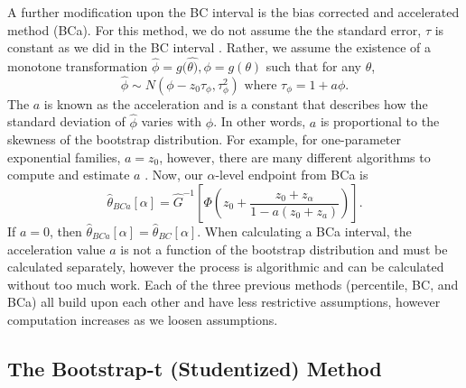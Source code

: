 \documentclass[12pt]{article}
\begin{document}
A further modification upon the BC interval is the bias corrected and
accelerated method (BCa). For this method, we do not assume the the
standard error, \(\tau\) is constant as we did in the BC interval
\citep[\citet{EfronCasi}]{Efron86}. Rather, we assume the existence of a
monotone transformation
\(\hat{\phi} = g(\hat{\theta)}, \phi = g(\theta)\) such that for any
\(\theta\),
\[\hat{\phi} \sim N(\phi - z_0\tau_\phi, \tau_\phi^2) \text{ where } \tau_\phi = 1+ a\phi.\]
The \(a\) is known as the acceleration and is a constant that describes
how the standard deviation of \(\hat{\phi}\) varies with \(\phi\). In
other words, \(a\) is proportional to the skewness of the bootstrap
distribution. For example, for one-parameter exponential families,
\(a=z_0\), however, there are many different algorithms to compute and
estimate \(a\) \citep{Flowers18}. Now, our \(\alpha\)-level endpoint
from BCa is
\[\hat{\theta}_{BCa}[\alpha] = \hat{G}^{-1} \left [ \Phi \left ( z_0 + \frac{z_0+z_\alpha}{1-a(z_0+z_a)} \right ) \right ].\]
If \(a = 0\), then
\(\hat{\theta}_{BCa}[\alpha] = \hat{\theta}_{BC}[\alpha].\) When
calculating a BCa interval, the acceleration value \(a\) is not a
function of the bootstrap distribution and must be calculated
separately, however the process is algorithmic and can be calculated
without too much work. Each of the three previous methods (percentile,
BC, and BCa) all build upon each other and have less restrictive
assumptions, however computation increases as we loosen assumptions.

\hypertarget{the-bootstrap-t-studentized-method}{%
\subsection{The Bootstrap-t (Studentized)
Method}\label{the-bootstrap-t-studentized-method}}
\end{document}
